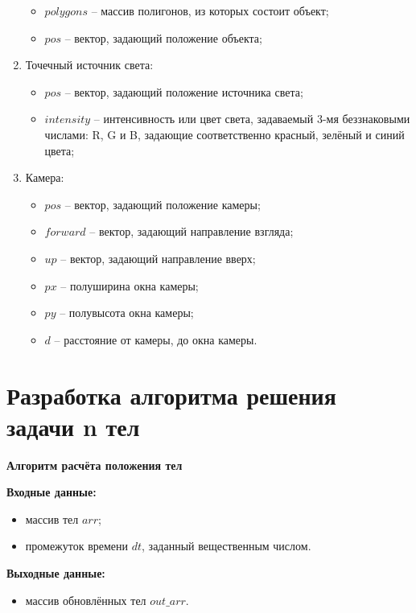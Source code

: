 \begin{enumerate}
\begin{itemize}
		\item $polygons$ -- массив полигонов, из которых состоит объект;
		\item $pos$ -- вектор, задающий положение объекта;
	\end{itemize}
	\item Точечный источник света:
	\begin{itemize}
		\item $pos$ -- вектор, задающий положение источника света;
		\item $intensity$ -- интенсивность или цвет света, задаваемый 3-мя беззнаковыми числами: R, G и B, задающие соответственно красный, зелёный и синий цвета;
	\end{itemize}
	\item Камера:
	\begin{itemize}
		\item $pos$ -- вектор, задающий положение камеры;
		\item $forward$ -- вектор, задающий направление взгляда;
		\item $up$ -- вектор, задающий направление вверх;
		\item $px$ -- полуширина окна камеры;
		\item $py$ -- полувысота окна камеры;
		\item $d$ -- расстояние от камеры, до окна камеры.
	\end{itemize}
\end{enumerate}


\section{Разработка алгоритма решения задачи n тел}

\textbf{Алгоритм расчёта положения тел}

\textbf{Входные данные:}
\begin{itemize}
	\item массив тел $arr$;
	\item промежуток времени $dt$, заданный вещественным числом.
\end{itemize}

\textbf{Выходные данные:}
\begin{itemize}
	\item массив обновлённых тел $out\_arr$.
\end{itemize}

